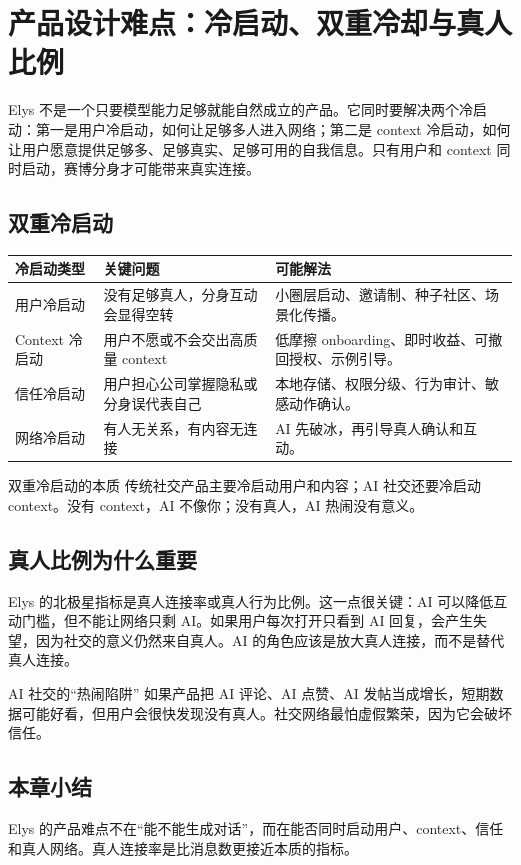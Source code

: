 \section{产品设计难点：冷启动、双重冷却与真人比例}

Elys 不是一个只要模型能力足够就能自然成立的产品。它同时要解决两个冷启动：第一是用户冷启动，如何让足够多人进入网络；第二是 context 冷启动，如何让用户愿意提供足够多、足够真实、足够可用的自我信息。只有用户和 context 同时启动，赛博分身才可能带来真实连接。

\subsection{双重冷启动}

\noindent\begin{longtable}{p{}p{}p{}}
\toprule
冷启动类型 & 关键问题 & 可能解法 \\
\midrule
用户冷启动 & 没有足够真人，分身互动会显得空转 & 小圈层启动、邀请制、种子社区、场景化传播。 \\
Context 冷启动 & 用户不愿或不会交出高质量 context & 低摩擦 onboarding、即时收益、可撤回授权、示例引导。 \\
信任冷启动 & 用户担心公司掌握隐私或分身误代表自己 & 本地存储、权限分级、行为审计、敏感动作确认。 \\
网络冷启动 & 有人无关系，有内容无连接 & AI 先破冰，再引导真人确认和互动。 \\
\bottomrule
\end{longtable}

\begin{importantbox}{双重冷启动的本质}
传统社交产品主要冷启动用户和内容；AI 社交还要冷启动 context。没有 context，AI 不像你；没有真人，AI 热闹没有意义。
\end{importantbox}

\subsection{真人比例为什么重要}

Elys 的北极星指标是真人连接率或真人行为比例。这一点很关键：AI 可以降低互动门槛，但不能让网络只剩 AI。如果用户每次打开只看到 AI 回复，会产生失望，因为社交的意义仍然来自真人。AI 的角色应该是放大真人连接，而不是替代真人连接。

\begin{warningbox}{AI 社交的“热闹陷阱”}
如果产品把 AI 评论、AI 点赞、AI 发帖当成增长，短期数据可能好看，但用户会很快发现没有真人。社交网络最怕虚假繁荣，因为它会破坏信任。
\end{warningbox}

\subsection{本章小结}

Elys 的产品难点不在“能不能生成对话”，而在能否同时启动用户、context、信任和真人网络。真人连接率是比消息数更接近本质的指标。

